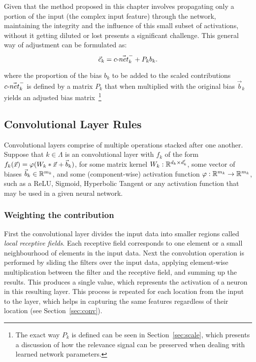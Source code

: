 Given that the \CTC\/ method proposed in this chapter involves propagating only a portion of the input (\ie the complex input feature) through the network, maintaining the integrity and the influence of this small subset of activations, without it getting diluted or lost presents a significant challenge. This general way of adjustment can be formulated as:
\begin{equation}
   \vec{c}_k  = \text{$c$-}\vec{net}_{k}^- +  P_{k}{b}_k.
\label{eq:ck} 
\end{equation} 

where the proportion of the bias ${b}_k$ to be added to the scaled contributions $\text{$c$-}\vec{net}_{k}^-$ is defined by a matrix $P_{k}$ that when multiplied with the original bias $\vec{b}_k$ yields an adjusted bias matrix~\footnote{The exact way $P_{k}$ is defined can be seen in Section~\ref{sec:scale}, which presents a discussion of how the relevance signal can be preserved when dealing with learned network parameters.}

\subsection{Convolutional Layer Rules}
Convolutional layers comprise of multiple operations stacked after one another. Suppose that $k\in \Lambda$ is an convolutional layer with $f_k$ of the form $f_k(\vec{x})=\varphi(W_k\ast\vec{x} + \vec{b}_k)$, for some matrix kernel $W_k:\mathbb{R}^{d_k\times d_k'}$, some vector of biases $\vec{b}_k\in \mathbb{R}^{m_k}$, and some (component-wise) activation function $\varphi:\mathbb{R}^{m_k}\to \mathbb{R}^{m_k}$, such as a ReLU, Sigmoid, Hyperbolic Tangent or any activation function that may be used in a given neural network.

\subsubsection{Weighting the contribution}
First the convolutional layer divides the input data into smaller regions called \emph{local receptive fields}. Each receptive field corresponds to one element or a small neighbourhood of elements in the input data. Next the convolution operation is performed by sliding the filters over the input data, applying element-wise multiplication between the filter and the receptive field, and summing up the results. This produces a single value, which represents the activation of a neuron in this resulting layer. This process is repeated for each location from the input to the layer, which helps in capturing the same features regardless of their location (see Section~\ref{sec:conv}).

